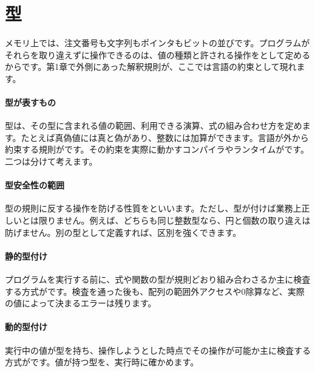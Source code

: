 \par
\endgroup


\section{型}
\label{sec:03-runtime-data-07}

メモリ上では、注文番号も文字列もポインタもビットの並びです。プログラムがそれらを取り違えずに操作できるのは、値の種類と許される操作をとして定めるからです。第1章で外側にあった解釈規則が、ここでは言語の約束として現れます。

\begingroup
\begingroup
\paragraph{型が表すもの}
        型は、その型に含まれる値の範囲、利用できる演算、式の組み合わせ方を定めます。たとえば真偽値には真と偽があり、整数には加算ができます。言語が外から約束する規則がです。その約束を実際に動かすコンパイラやランタイムがです。二つは分けて考えます。

\paragraph{型安全性の範囲}
        型の規則に反する操作を防げる性質をといいます。ただし、型が付けば業務上正しいとは限りません。例えば、どちらも同じ整数型なら、円と個数の取り違えは防げません。別の型として定義すれば、区別を強くできます。

\par
\endgroup
\medskip
\begingroup
\paragraph{静的型付け}
        プログラムを実行する前に、式や関数の型が規則どおり組み合わさるか主に検査する方式がです。検査を通った後も、配列の範囲外アクセスや0除算など、実際の値によって決まるエラーは残ります。

\paragraph{動的型付け}
        実行中の値が型を持ち、操作しようとした時点でその操作が可能か主に検査する方式がです。値が持つ型を、実行時に確かめます。

\par
\endgroup
\par
\endgroup


